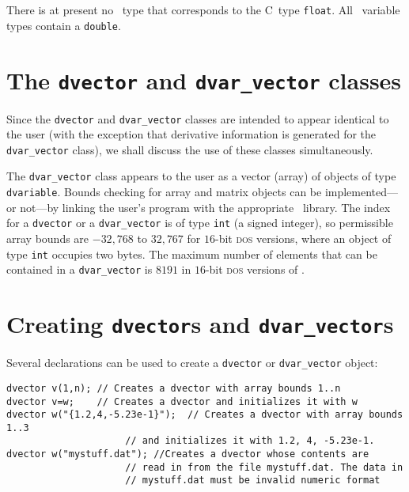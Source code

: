 \documentclass{admbmanual}
\begin{document}
There is at present no \scAD\ type that corresponds to the C~type
\texttt{float}. All \scAD\ variable types contain a \texttt{double}.

\section{The \texttt{dvector} and \texttt{dvar\_vector} classes}

Since the \texttt{dvector} and \texttt{dvar\_vector} classes are intended to
appear identical to the user (with the exception that derivative information is
generated for the \texttt{dvar\_vector} class), we shall discuss the use of
these classes simultaneously.

The \texttt{dvar\_vector} class appears to the user as a vector (array) of
objects of type \texttt{dvariable}. Bounds checking for array and matrix objects
can be implemented---or not---by linking the user's program with the appropriate
\scAD\ library. The index for a \texttt{dvector} or a \texttt{dvar\_vector} is
of type \texttt{int} (a signed integer), so permissible array bounds are
$-32,768$ to $32,767$ for $16$-bit \textsc{dos} versions, where an object of
type \texttt{int} occupies two bytes. The maximum number of elements that can be
contained in a \texttt{dvar\_vector} is $8191$ in $16$-bit \textsc{dos} versions
of \scAD.

\section{Creating \texttt{dvector}s and \texttt{dvar\_vector}s}

Several declarations can be used to create a \texttt{dvector} or
\texttt{dvar\_vector} object:
\begin{lstlisting}
dvector v(1,n); // Creates a dvector with array bounds 1..n
dvector v=w;    // Creates a dvector and initializes it with w
dvector w("{1.2,4,-5.23e-1}");  // Creates a dvector with array bounds 1..3
                     // and initializes it with 1.2, 4, -5.23e-1.
dvector w("mystuff.dat"); //Creates a dvector whose contents are
                     // read in from the file mystuff.dat. The data in
                     // mystuff.dat must be invalid numeric format
\end{lstlisting}
\end{document}
